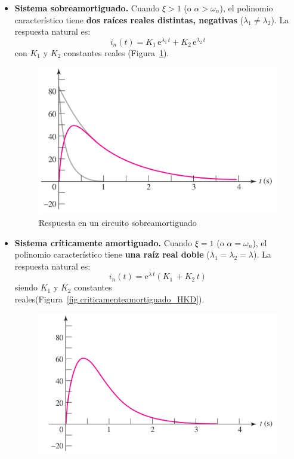 	\begin{itemize}
	    \item \textbf{Sistema sobreamortiguado.} Cuando $\xi>1$ (o $\alpha>\omega_n$), el polinomio característico tiene \textbf{dos raíces reales distintas, negativas} ($\lambda_1\neq\lambda_2$). La respuesta natural es:
    	\begin{equation*}
    	 i_n(t)=K_1\,\mathrm{e}^{\lambda_1\,t}+K_2\,\mathrm{e}^{\lambda_2\,t}   
    	\end{equation*}
	con $K_1$ y $K_2$ constantes reales (Figura~\ref{fig.sobreamortiguado_HKD}). 
	\begin{figure}[H]
	    \centering
	    \includegraphics{../figs/Sobreamortiguado_HKD.pdf}
	    \caption{Respuesta en un circuito sobreamortiguado}
	    \label{fig.sobreamortiguado_HKD}
	\end{figure}
	    \item \textbf{Sistema críticamente amortiguado.} Cuando $\xi=1$ (o $\alpha=\omega_n$), el polinomio característico tiene \textbf{una raíz real doble} ($\lambda_1=\lambda_2=\lambda$). La respuesta natural es:
	\begin{equation*}
	 i_n(t)=\mathrm{e}^{\lambda\,t}(K_1\,+K_2\,t)   
	\end{equation*}
	siendo $K_1$ y $K_2$ constantes reales(Figura~\ref{fig.criticamenteamortiguado_HKD}). 
	\begin{figure}[H]
	    \centering
	    \includegraphics{../figs/AmortiguamientoCritico_HKD.pdf}

\end{figure}
\end{itemize}
